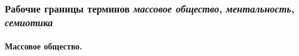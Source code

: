 
\subsubsection{Рабочие границы терминов \emph{массовое общество}, \emph{ментальность}, \emph{семиотика}} \label{1.1}
\paragraph{Массовое общество.}\label{1.1.1}

